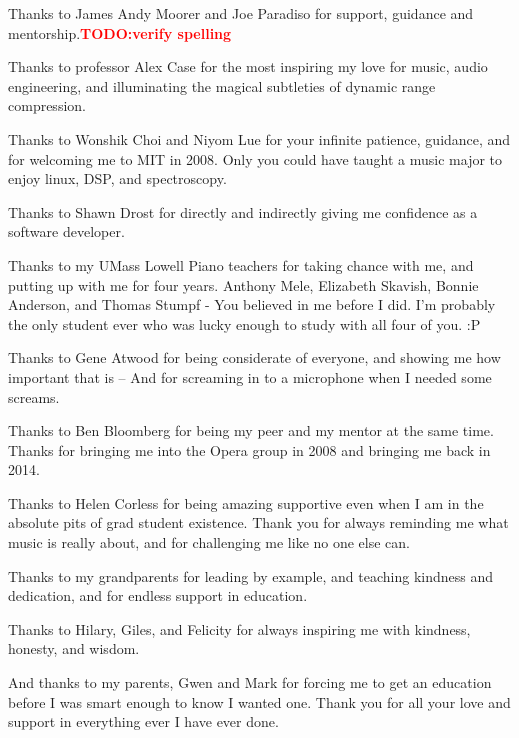 \documentclass{tufte-book}
\newcommand{\TODO}[1]{\textcolor{red}{\bf TODO:#1}\xspace}
\begin{document}
Thanks to James Andy Moorer and Joe Paradiso for support, guidance and
mentorship.\TODO{verify spelling}

Thanks to professor Alex Case for the most inspiring my love for
music, audio engineering, and illuminating the magical subtleties of
dynamic range compression.

Thanks to Wonshik Choi and Niyom Lue for your infinite patience,
guidance, and for welcoming me to MIT in 2008. Only you could have
taught a music major to enjoy linux, DSP, and spectroscopy.

Thanks to Shawn Drost for directly and indirectly giving me confidence
as a software developer.

Thanks to my UMass Lowell Piano teachers for taking chance with me,
and putting up with me for four years. Anthony Mele, Elizabeth
Skavish, Bonnie Anderson, and Thomas Stumpf - You believed in me
before I did. I'm probably the only student ever who was lucky enough
to study with all four of you. :P

Thanks to Gene Atwood for being considerate of everyone, and showing
me how important that is -- And for screaming in to a microphone when
I needed some screams.

Thanks to Ben Bloomberg for being my peer and my mentor at the same
time. Thanks for bringing me into the Opera group in 2008 and bringing
me back in 2014.

Thanks to Helen Corless for being amazing supportive even when I am in
the absolute pits of grad student existence. Thank you for always
reminding me what music is really about, and for challenging me like
no one else can.

Thanks to my grandparents for leading by example, and teaching
kindness and dedication, and for endless support in education.

Thanks to Hilary, Giles, and Felicity for always inspiring me with
kindness, honesty, and wisdom. 

And thanks to my parents, Gwen and Mark for forcing me to get an
education before I was smart enough to know I wanted one. Thank you for
all your love and support in everything ever I have ever done.



\end{document}
